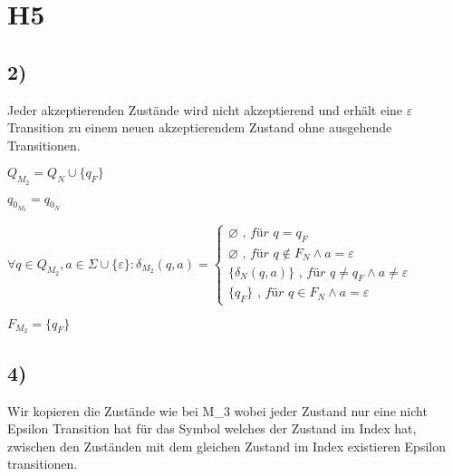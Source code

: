\section*{H5}

\subsection*{2)}

Jeder akzeptierenden Zustände wird nicht akzeptierend und erhält eine $\varepsilon$ 
Transition zu einem neuen akzeptierendem Zustand ohne ausgehende Transitionen.

$Q_{M_2} = Q_N \cup \{q_F\}$

$q_{0_{M_2}} = q_{0_N}$

$\forall q \in Q_{M_2}, a \in \Sigma \cup \{\varepsilon\}:
\delta_{M_2}(q,a) =
\begin{cases}
\varnothing \textit{ , für }q = q_F \\
\varnothing \textit{ , für }q \notin F_N \wedge a = \varepsilon \\
\{\delta_N(q,a)\} \textit{ , für } q \neq q_F \wedge a \neq \varepsilon \\
\{q_F\} \textit{ , für } q \in F_N \wedge a = \varepsilon
\
\end{cases}$

$F_{M_2} = \{q_F\}$

\subsection*{4)}

Wir kopieren die Zustände wie bei M_3 wobei jeder Zustand nur eine nicht Epsilon Transition hat für das Symbol welches der Zustand im Index hat, zwischen den Zuständen mit dem gleichen Zustand im Index existieren Epsilon transitionen.